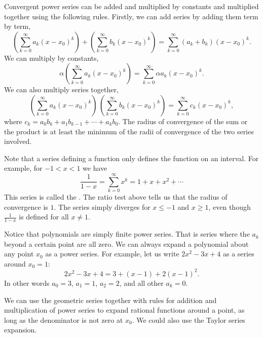 \documentclass[12pt]{book}
\begin{document}
Convergent power series can be added and multiplied by
constants and multiplied together using the
following rules.  Firstly, we can add series
by adding them term by term,
\begin{equation*}
\left(\sum_{k=0}^\infty a_k {(x-x_0)}^k\right)
+
\left(\sum_{k=0}^\infty b_k {(x-x_0)}^k\right)
=
\sum_{k=0}^\infty (a_k+b_k) {(x-x_0)}^k .
\end{equation*}
We can multiply by constants,
\begin{equation*}
\alpha
\left(\sum_{k=0}^\infty a_k {(x-x_0)}^k\right)
=
\sum_{k=0}^\infty \alpha a_k {(x-x_0)}^k .
\end{equation*}
We can also multiply series together,
\begin{equation*}
\left(\sum_{k=0}^\infty a_k {(x-x_0)}^k\right)
\,
\left(\sum_{k=0}^\infty b_k {(x-x_0)}^k\right)
=
\sum_{k=0}^\infty c_k {(x-x_0)}^k ,
\end{equation*}
where
$c_k = a_0b_k + a_1 b_{k-1} + \cdots + a_k b_0$.
The radius of convergence of the sum or the product
is at least the minimum of the radii of convergence of
the two series involved.

\medskip

Note that a series defining a function only defines the function
on an interval.  For example, for $-1 < x < 1$ we have
\begin{equation*}
\frac{1}{1-x} =
\sum_{k=0}^\infty x^k =
1 + x + x^2 + \cdots
\end{equation*}
This series is called the \emph{}.  The ratio
test above tells us that the radius of convergence is $1$.  The series
simply diverges for $x \leq -1$ and $x \geq 1$, even though
$\frac{1}{1-x}$ is defined for all $x \not= 1$.

Notice that
polynomials are simply finite power series.  That is series where
the $a_k$ beyond a certain point are all zero.  We can always expand
a polynomial about any point $x_0$ as a power series.  For example,
let us write
$2x^2-3x+4$ as a series around $x_0 = 1$:
\begin{equation*}
2x^2-3x+4 = 3 + (x-1) + 2(x-1)^2 .
\end{equation*}
In other words $a_0 = 3$, $a_1 = 1$, $a_2 = 2$, and all other
$a_k = 0$.

We can use the geometric series together with rules for addition and
multiplication of power series to expand rational functions around
a point, as long as the denominator is not zero at $x_0$.  We could
also use the Taylor series expansion.
\end{document}
